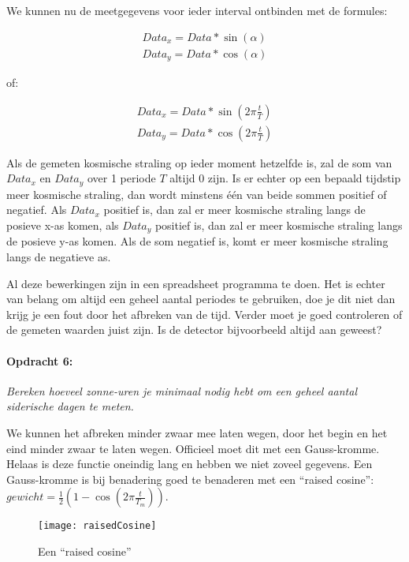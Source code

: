 We kunnen nu de meetgegevens voor ieder interval ontbinden met de
formules:

\begin{equation}
\begin{array}{c}
Data_{x}=Data*\sin(\alpha)\\
Data_{y}=Data*\cos(\alpha)
\end{array}
\end{equation}


of:

\begin{equation}
\begin{array}{c}
Data_{x}=Data*\sin(2\pi\frac{t}{T})\\
Data_{y}=Data*\cos(2\pi\frac{t}{T})
\end{array}
\end{equation}


Als de gemeten kosmische straling op ieder moment hetzelfde is, zal
de som van $Data_{x}$ en $Data_{y}$ over 1 periode $T$ altijd 0
zijn. Is er echter op een bepaald tijdstip meer kosmische straling,
dan wordt minstens één van beide sommen positief of negatief. Als
$Data_{x}$ positief is, dan zal er meer kosmische straling langs
de posieve x-as komen, als $Data_{y}$ positief is, dan zal er meer
kosmische straling langs de posieve y-as komen. Als de som negatief
is, komt er meer kosmische straling langs de negatieve as.

Al deze bewerkingen zijn in een spreadsheet programma te doen. Het
is echter van belang om altijd een geheel aantal periodes te gebruiken,
doe je dit niet dan krijg je een fout door het afbreken van de tijd.
Verder moet je goed controleren of de gemeten waarden juist zijn.
Is de detector bijvoorbeeld altijd aan geweest?


\paragraph*{Opdracht 6:}

\emph{Bereken hoeveel zonne-uren je minimaal nodig hebt om een geheel
aantal siderische dagen te meten.}

We kunnen het afbreken minder zwaar mee laten wegen, door het begin
en het eind minder zwaar te laten wegen. Officieel moet dit met een
Gauss-kromme. Helaas is deze functie oneindig lang en hebben we niet
zoveel gegevens. Een Gauss-kromme is bij benadering goed te benaderen
met een ``raised cosine'': $gewicht=\frac{1}{2}(1-\cos(2\pi\frac{t}{T_{m}}))$.

\begin{figure}[h]
    \centering
    \texttt{[image: raisedCosine]}
    \caption{Een ``raised cosine''}
\end{figure}


